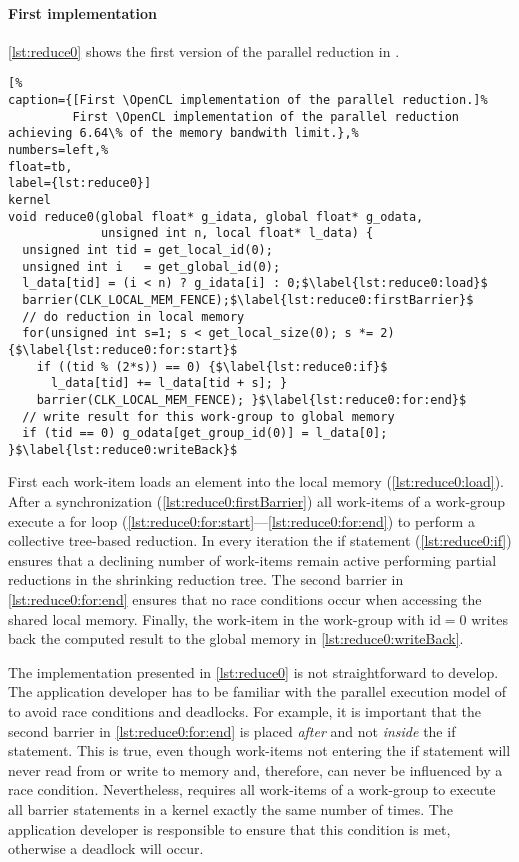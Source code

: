 \paragraph{First \OpenCL implementation}
\autoref{lst:reduce0} shows the first version of the parallel reduction in \OpenCL.
%
\begin{lstlisting}[%
caption={[First \OpenCL implementation of the parallel reduction.]%
         First \OpenCL implementation of the parallel reduction achieving 6.64\% of the memory bandwith limit.},%
numbers=left,%
float=tb,
label={lst:reduce0}]
kernel
void reduce0(global float* g_idata, global float* g_odata,
             unsigned int n, local float* l_data) {
  unsigned int tid = get_local_id(0);
  unsigned int i   = get_global_id(0);
  l_data[tid] = (i < n) ? g_idata[i] : 0;$\label{lst:reduce0:load}$
  barrier(CLK_LOCAL_MEM_FENCE);$\label{lst:reduce0:firstBarrier}$
  // do reduction in local memory
  for(unsigned int s=1; s < get_local_size(0); s *= 2) {$\label{lst:reduce0:for:start}$
    if ((tid % (2*s)) == 0) {$\label{lst:reduce0:if}$
      l_data[tid] += l_data[tid + s]; }
    barrier(CLK_LOCAL_MEM_FENCE); }$\label{lst:reduce0:for:end}$
  // write result for this work-group to global memory
  if (tid == 0) g_odata[get_group_id(0)] = l_data[0]; }$\label{lst:reduce0:writeBack}$
\end{lstlisting}
First each work-item loads an element into the local memory (\autoref{lst:reduce0:load}).
After a synchronization (\autoref{lst:reduce0:firstBarrier}) all work-items of a work-group execute a for loop (\autoref{lst:reduce0:for:start}---\autoref{lst:reduce0:for:end}) to perform a collective tree-based reduction.
In every iteration the if statement (\autoref{lst:reduce0:if}) ensures that a declining number of work-items remain active performing partial reductions in the shrinking reduction tree.
The second barrier in \autoref{lst:reduce0:for:end} ensures that no race conditions occur when accessing the shared local memory.
Finally, the work-item in the work-group with id$=0$ writes back the computed result to the global memory in \autoref{lst:reduce0:writeBack}.


The implementation presented in \autoref{lst:reduce0} is not straightforward to develop.
The application developer has to be familiar with the parallel execution model of \OpenCL to avoid race conditions and deadlocks.
For example, it is important that the second barrier in \autoref{lst:reduce0:for:end} is placed \emph{after} and not \emph{inside} the if statement.
This is true, even though work-items not entering the if statement will never read from or write to memory and, therefore, can never be influenced by a race condition.
Nevertheless, \OpenCL requires all work-items of a work-group to execute all barrier statements in a kernel exactly the same number of times.
The application developer is responsible to ensure that this condition is met, otherwise a deadlock will occur.

